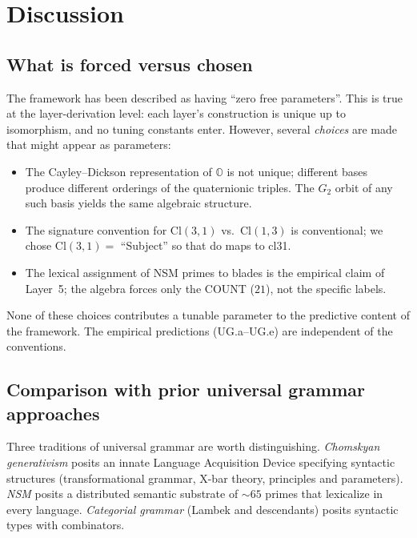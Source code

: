 \documentclass[11pt,a4paper]{article}
\theoremstyle{plain}
\theoremstyle{definition}
\theoremstyle{remark}
\numberwithin{equation}{section}
\providecommand{\Cl}{\mathrm{Cl}}
\providecommand{\OO}{\mathbb{O}}
\begin{document}
\section{Discussion}\label{sec:discussion}

\subsection{What is forced versus chosen}

The framework has been described as having ``zero free
parameters''.  This is true at the layer-derivation level: each
layer's construction is unique up to isomorphism, and no tuning
constants enter.  However, several \emph{choices} are made that
might appear as parameters:

\begin{itemize}
\item The Cayley--Dickson representation of $\OO$ is not unique;
      different bases produce different orderings of the
      quaternionic triples.  The $G_2$ orbit of any such basis
      yields the same algebraic structure.
\item The signature convention for $\Cl(3,1)$ vs.\ $\Cl(1,3)$ is
      conventional; we chose $\Cl(3,1) = $ ``Subject'' so that
      \textsf{do} maps to cl31.
\item The lexical assignment of NSM primes to blades is the
      empirical claim of Layer~5; the algebra forces only the
      COUNT ($21$), not the specific labels.
\end{itemize}

None of these choices contributes a tunable parameter to the
predictive content of the framework.  The empirical predictions
(UG.a--UG.e) are independent of the conventions.

\subsection{Comparison with prior universal grammar approaches}

Three traditions of universal grammar are worth distinguishing.
\emph{Chomskyan generativism} posits an innate Language Acquisition
Device specifying syntactic structures (transformational grammar,
X-bar theory, principles and parameters).  \emph{NSM} posits a
distributed semantic substrate of $\sim 65$ primes that lexicalize
in every language.  \emph{Categorial grammar} (Lambek and
descendants) posits syntactic types with combinators.
\end{document}
